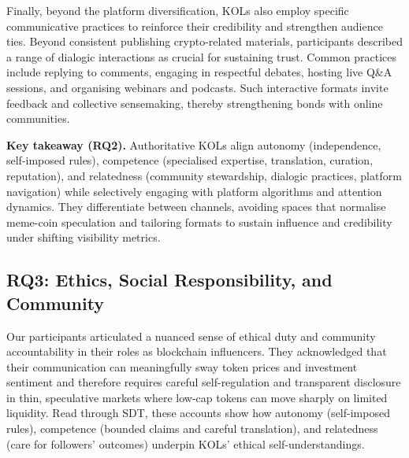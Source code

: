 Finally, beyond the platform diversification, KOLs also employ specific communicative practices to reinforce their credibility and strengthen audience ties. Beyond consistent publishing crypto-related materials,  participants described a range of dialogic interactions as crucial for sustaining trust. Common practices include replying to comments, engaging in respectful debates, hosting live Q\&A sessions, and organising webinars and podcasts. Such interactive formats invite feedback and collective sensemaking, thereby strengthening bonds with online communities.


\noindent\textbf{Key takeaway (RQ2).} Authoritative KOLs align autonomy (independence, self-imposed rules), competence (specialised expertise, translation, curation, reputation), and relatedness (community stewardship, dialogic practices, platform navigation) while selectively engaging with platform algorithms and attention dynamics. They differentiate between channels, avoiding spaces that normalise meme-coin speculation and tailoring formats to sustain influence and credibility under shifting visibility metrics.

\subsection{RQ3: Ethics, Social Responsibility, and Community}\label{sec:rq3}

Our participants articulated a nuanced sense of ethical duty and community accountability in their roles as blockchain influencers. They acknowledged that their communication can meaningfully sway token prices and investment sentiment and therefore requires careful self-regulation and transparent disclosure in thin, speculative markets where low-cap tokens can move sharply on limited liquidity. Read through SDT, these accounts show how autonomy (self-imposed rules), competence (bounded claims and careful translation), and relatedness (care for followers' outcomes) underpin KOLs' ethical self-understandings.

